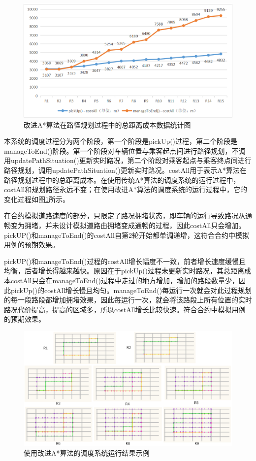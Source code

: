 \begin{figure}[!ht]
  \centering
  \includegraphics[width=1\textwidth]{undergraduate-thesis/images/CostAllAnalysis.png}
  \caption{改进A*算法在路径规划过程中的总距离成本数据统计图}
  \label{nine-new-Taxi-cost} %
\end{figure}

本系统的调度过程分为两个阶段，第一个阶段是pickUp()过程，第二个阶段是manageToEnd()阶段。第一个阶段对车辆位置与乘客起点间进行路径规划，不调用updatePathSituation()更新实时路况，第二个阶段对乘客起点与乘客终点间进行路径规划，调用updatePathSituation()更新实时路况。costAll用于表示A*算法在路径规划过程中的总距离成本。在使用传统A*算法的调度系统的运行过程中，costAll和规划路径永远不变；在使用改进A*算法的调度系统的运行过程中，它的变化过程如图\ref{nine-new-Taxi-cost}所示。

在合约模拟道路速度的部分，只限定了路况拥堵状态，即车辆的运行导致路况从通畅变为拥堵，并未设计模拟道路由拥堵变成通畅的过程，因此costAll只会增加。pickUP()和manageToEnd()的costAll自第2轮开始都单调递增，这符合合约中模拟用例的预期效果。

pickUP()和manageToEnd()过程的costAll增长幅度不一致，前者增长速度缓慢且均衡，后者增长得越来越快。原因在于pickUp()过程未更新实时路况，其总距离成本costAll只会在manageToEnd()过程中走过的地方增加，增加的路段数量少，因此pickUp()的costAll增长慢且均匀。manageToEnd()每运行一次就会对此过程规划的每一段路段都增加拥堵效果，因此每运行一次，就会将该路段上所有位置的实时路况代价提高，提高的区域多，所以costAll增长比较快速。符合合约中模拟用例的预期效果。

\begin{figure}[!ht]
  \centering
  \includegraphics[width=1\textwidth]{undergraduate-thesis/images/2023-05-17.png}
  \caption{使用改进A*算法的调度系统运行结果示例}
  \label{nine-new-Taxi-pic1} %
\end{figure}

